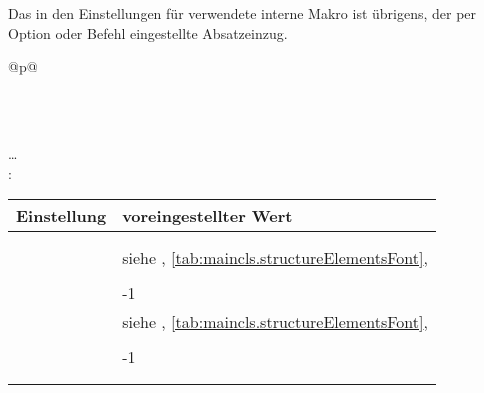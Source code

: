 Das in den Einstellungen für  verwendete
interne Makro  ist übrigens, der per Option
 oder Befehl
 eingestellte Absatzeinzug.%
  \begin{longtable}{@{}p{\columnwidth}@{}}
    \caption{Voreinstellungen für die Formatierung der Überschriften von
       und }%
    \label{tab:maincls.section.defaults}\\
    \endfirsthead
    \caption[]{Voreinstellungen für die Formatierung der Überschriften von
       und
       \emph{(Fortsetzung)}}\\
    \addlinespace[-\normalbaselineskip] \endhead
    \raggedleft\dots\\
    \endfoot \endlastfoot
    : \\*
    \begin{tabularx}{\linewidth}{ll}
    \toprule
    Einstellung & voreingestellter Wert \\
    \midrule
    \PValue{afterskip}   & \PValue{0pt plus 1fil} \\
    \PValue{beforeskip}  & \PValue{0pt plus 1fil + \Length{baselineskip}} \\
    \PValue{font}        & siehe  \DescRef{maincls.fontelement.part}, 
                           \autoref{tab:maincls.structureElementsFont}, 
                           \autopageref{tab:maincls.structureElementsFont} \\
    \PValue{innerskip}   & \PValue{20pt} \\
    \PValue{level}       & -1 \\
    \PValue{prefixfont}  & siehe 
                           \DescRef{maincls.fontelement.partnumber},
                           \autoref{tab:maincls.structureElementsFont}, 
                           \autopageref{tab:maincls.structureElementsFont} \\
    \PValue{tocindent}   & \PValue{0pt} \\
    \PValue{toclevel}    & -1 \\
    \PValue{tocnumwidth} & \PValue{2em} \\
    \PValue{tocstyle}    & \PValue{part} \\
    \bottomrule
    \end{tabularx} \\
    \addlinespace[\normalbaselineskip]

\end{longtable}
